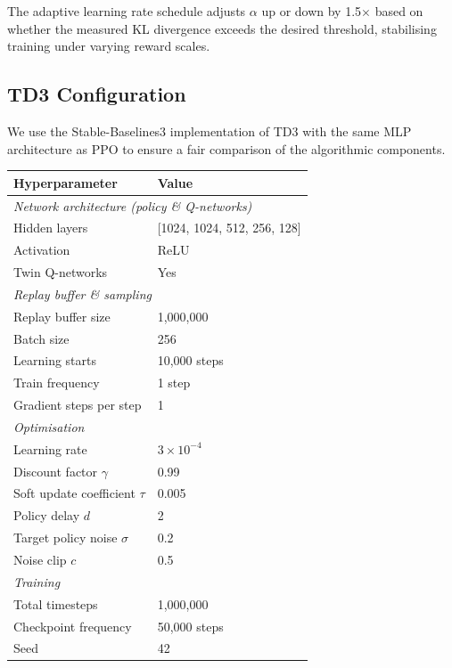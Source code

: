 \documentclass{article}
\begin{document}
The adaptive learning rate schedule adjusts $\alpha$ up or down by 1.5$\times$
based on whether the measured KL divergence exceeds the desired threshold,
stabilising training under varying reward scales.

\subsection{TD3 Configuration}

We use the Stable-Baselines3 implementation of TD3 \cite{raffin2021stable}
with the same MLP architecture as PPO to ensure a fair comparison of the
algorithmic components.

\begin{center}
\begin{tabular}{ll}
  \toprule
  \textbf{Hyperparameter} & \textbf{Value} \\
  \midrule
  \multicolumn{2}{l}{\textit{Network architecture (policy \& Q-networks)}} \\
  \quad Hidden layers & [1024, 1024, 512, 256, 128] \\
  \quad Activation & ReLU \\
  \quad Twin Q-networks & Yes \\
  \midrule
  \multicolumn{2}{l}{\textit{Replay buffer \& sampling}} \\
  \quad Replay buffer size & 1{,}000{,}000 \\
  \quad Batch size & 256 \\
  \quad Learning starts & 10{,}000 steps \\
  \quad Train frequency & 1 step \\
  \quad Gradient steps per step & 1 \\
  \midrule
  \multicolumn{2}{l}{\textit{Optimisation}} \\
  \quad Learning rate & $3\times10^{-4}$ \\
  \quad Discount factor $\gamma$ & 0.99 \\
  \quad Soft update coefficient $\tau$ & 0.005 \\
  \quad Policy delay $d$ & 2 \\
  \quad Target policy noise $\sigma$ & 0.2 \\
  \quad Noise clip $c$ & 0.5 \\
  \midrule
  \multicolumn{2}{l}{\textit{Training}} \\
  \quad Total timesteps & 1{,}000{,}000 \\
  \quad Checkpoint frequency & 50{,}000 steps \\
  \quad Seed & 42 \\
  \bottomrule
\end{tabular}
\end{center}
\end{document}

